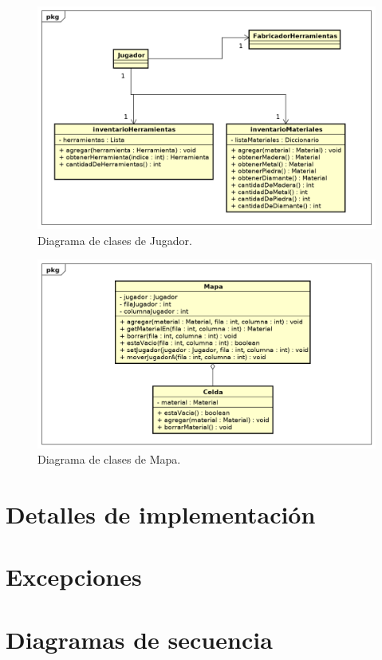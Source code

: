 \documentclass[titlepage,a4paper]{article}
\begin{document}
\begin{figure}[H]
\centering
\includegraphics[width=\textwidth]{Diagramas/Jugador.png}
\caption{\label{fig:jugador}Diagrama de clases de Jugador.}
\end{figure}

\begin{figure}[H]
\centering
\includegraphics[width=\textwidth]{Diagramas/Mapa.png}
\caption{\label{fig:mapa}Diagrama de clases de Mapa.}
\end{figure}

\section{Detalles de implementación}\label{sec:implementacion}

\section{Excepciones}\label{sec:excepciones}

\section{Diagramas de secuencia}\label{sec:diagramasdesecuencia}
\end{document}

